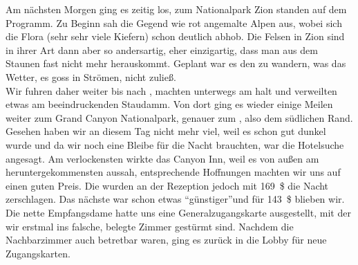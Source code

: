 Am nächsten Morgen ging es zeitig los,  zum Nationalpark Zion standen auf dem Programm.
Zu Beginn sah die Gegend wie rot angemalte Alpen aus, wobei sich die Flora (sehr sehr viele Kiefern) schon deutlich abhob.
Die Felsen in Zion sind in ihrer Art dann aber so andersartig, eher einzigartig, dass man aus dem Staunen fast nicht mehr herauskommt.
Geplant war es den  zu wandern, was das Wetter, es goss in Strömen, nicht zuließ.\\

Wir fuhren daher weiter bis nach , machten unterwegs am  halt und verweilten etwas am beeindruckenden  Staudamm.
Von dort ging es wieder einige Meilen weiter zum Grand Canyon Nationalpark, genauer zum , also dem südlichen Rand.\\

Gesehen haben wir an diesem Tag nicht mehr viel, weil es schon gut dunkel wurde und da wir noch eine Bleibe für die Nacht brauchten, war die Hotelsuche angesagt.
Am verlockensten wirkte das Canyon Inn, weil es von außen am heruntergekommensten aussah, entsprechende Hoffnungen machten wir uns auf einen guten Preis.
Die wurden an der Rezeption jedoch mit 169~\$ die Nacht zerschlagen.
Das nächste war schon etwas \textquotedblleft günstiger\textquotedblright und für 143~\$ blieben wir.
Die nette Empfangsdame hatte uns eine Generalzugangskarte ausgestellt, mit der wir erstmal ins falsche, belegte Zimmer gestürmt sind.
Nachdem die Nachbarzimmer auch betretbar waren, ging es zurück in die Lobby für neue Zugangskarten.
